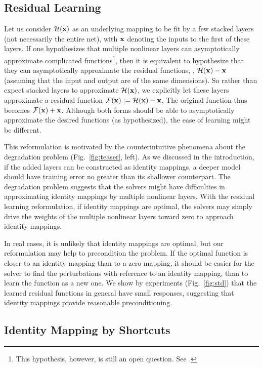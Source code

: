 \subsection{Residual Learning}
\label{sec:motivation}

Let us consider $\mathcal{H}(\mathbf{x})$ as an underlying mapping to be fit by a few stacked layers (not necessarily the entire net), with $\mathbf{x}$ denoting the inputs to the first of these layers. If one hypothesizes that multiple nonlinear layers can asymptotically approximate complicated functions\footnote{This hypothesis, however, is still an open question. See \cite{Montufar2014}.}, then it is equivalent to hypothesize that they can asymptotically approximate the residual functions, \ie, $\mathcal{H}(\mathbf{x})-\mathbf{x}$ (assuming that the input and output are of the same dimensions).
So rather than expect stacked layers to approximate $\mathcal{H}(\mathbf{x})$, we explicitly let these layers approximate a residual function $\mathcal{F}(\mathbf{x}):=\mathcal{H}(\mathbf{x})-\mathbf{x}$. The original function thus becomes $\mathcal{F}(\mathbf{x})+\mathbf{x}$. Although both forms should be able to asymptotically approximate the desired functions (as hypothesized), the ease of learning might be different.

This reformulation is motivated by the counterintuitive phenomena about the degradation problem (Fig.~\ref{fig:teaser}, left). As we discussed in the introduction, if the added layers can be constructed as identity mappings, a deeper model should have training error no greater than its shallower counterpart. The degradation problem suggests that the solvers might have difficulties in approximating identity mappings by multiple nonlinear layers. With the residual learning reformulation, if identity mappings are optimal, the solvers may simply drive the weights of the multiple nonlinear layers toward zero to approach identity mappings.

In real cases, it is unlikely that identity mappings are optimal, but our reformulation may help to precondition the problem. If the optimal function is closer to an identity mapping than to a zero mapping, it should be easier for the solver to find the perturbations with reference to an identity mapping, than to learn the function as a new one. We show by experiments (Fig.~\ref{fig:std}) that the learned residual functions in general have small responses, suggesting that identity mappings provide reasonable preconditioning.

\subsection{Identity Mapping by Shortcuts}

